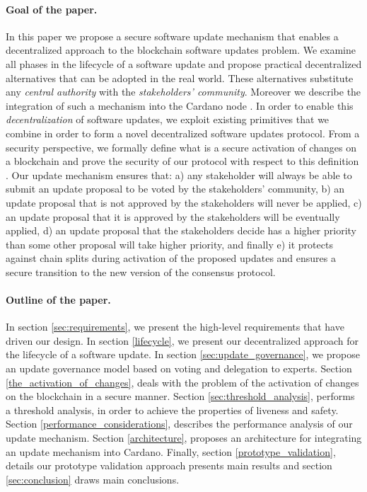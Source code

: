 \paragraph{Goal of the paper.} In this paper we propose a secure software 
update mechanism that enables a decentralized approach to the blockchain 
software updates problem. We examine all phases in the lifecycle of a software 
update and propose practical decentralized alternatives that can be adopted in 
the real world. These alternatives substitute any \emph{central authority} with 
the \emph{stakeholders' community}. Moreover we describe the integration of 
such a mechanism into the Cardano node \cite{cardano}. In order to enable this 
\emph{decentralization} of software updates, we exploit existing primitives 
that we combine in order to form a novel decentralized software updates 
protocol. From a security perspective, we formally define what is a secure 
activation of changes on a blockchain and prove the security of our protocol 
with respect to this definition \cite{secure_activation} .  Our update mechanism
ensures that:
a) any stakeholder will always be able to submit an update proposal to be voted by the stakeholders' community, b) an update proposal that is not approved by the stakeholders
 will never be applied, c) an update proposal that it is approved by the 
 stakeholders will be eventually applied, d) an update proposal that the 
 stakeholders decide has a higher priority than some other proposal will take 
 higher priority, 
 and finally e) it protects against chain splits during activation of the 
 proposed updates and ensures a secure transition to the new version of the 
 consensus protocol.

\paragraph{Outline of the paper.} 
In section \ref{sec:requirements}, we present the high-level requirements that 
have driven our design. In section \ref{lifecycle}, we present our 
decentralized approach for the lifecycle of a software update. In section 
\ref{sec:update_governance}, we propose an update governance model based on 
voting and delegation to experts. Section \ref{the_activation_of_changes}, 
deals 
with the problem of the activation of changes on the blockchain in a secure 
manner. Section \ref{sec:threshold_analysis}, performs a threshold analysis, in 
order to achieve the properties of liveness and safety. Section 
\ref{performance_considerations}, describes the performance analysis of our 
update mechanism. Section \ref{architecture}, proposes an architecture for 
integrating an update mechanism into Cardano. Finally, section 
\ref{prototype_validation}, details our prototype validation approach presents 
main results and 
section \ref{sec:conclusion} draws main conclusions.